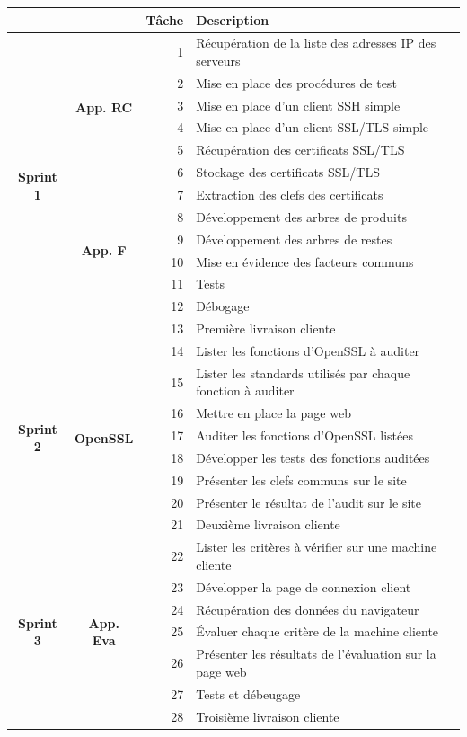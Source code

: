 \documentclass[a4paper,11pt,french]{article}
\begin{document}
\begin{tabular}{|c|c|r|l|}
\hline
&&\textbf{Tâche} & \textbf{Description}\\
\hline
\multirow{13}{*}{\begin{sideways}\textbf{Sprint 1}\end{sideways}}&\multirow{6}{*}{\textbf{App. RC}}
&  1 & Récupération de la liste des adresses IP des serveurs\\
&& 2 & Mise en place des procédures de test			\\
&& 3 & Mise en place d'un client SSH simple			\\
&& 4 & Mise en place d'un client SSL/TLS simple		\\
&& 5 & Récupération des certificats SSL/TLS 		\\
&& 6 & Stockage des certificats SSL/TLS				\\
\cline{2-4}
&\multirow{6}{*}{\textbf{App. F}}
&  7 &  Extraction des clefs des certificats		\\
&& 8 &  Développement des arbres de produits		\\
&& 9 &  Développement des arbres de restes			\\
&& 10 &  Mise en évidence des facteurs communs		\\
&& 11 &  Tests										\\
&& 12 &  Débogage									\\
&& 13 &  Première livraison cliente					\\
\cline{1-4}
\multirow{8}{*}{\begin{sideways}\textbf{Sprint 2}\end{sideways}}&\multirow{8}{*}{\textbf{OpenSSL}}
&  14 &  Lister les fonctions d'OpenSSL à auditer\\
&& 15 &  Lister les standards utilisés par chaque fonction à auditer\\
&& 16 &  Mettre en place la page web\\
&& 17 &	 Auditer les fonctions d'OpenSSL listées\\
&& 18 &  Développer les tests des fonctions auditées\\
&& 19 &  Présenter les clefs communs sur le site\\
&& 20 &  Présenter le résultat de l'audit sur le site\\
&& 21 &  Deuxième livraison cliente\\
\hline

\multirow{7}{*}{\begin{sideways}\textbf{Sprint 3}\end{sideways}}&\multirow{7}{*}{\textbf{App. Eva}}
&  22 & Lister les critères à vérifier sur une machine cliente\\
&& 23 & Développer la page de connexion client\\
&& 24 & Récupération des données du navigateur\\
&& 25 & Évaluer chaque critère de la machine cliente\\
&& 26 & Présenter les résultats de l'évaluation sur la page web\\
&& 27 & Tests et débeugage\\
&& 28 & Troisième livraison cliente\\\hline


\end{tabular}
\end{document}
